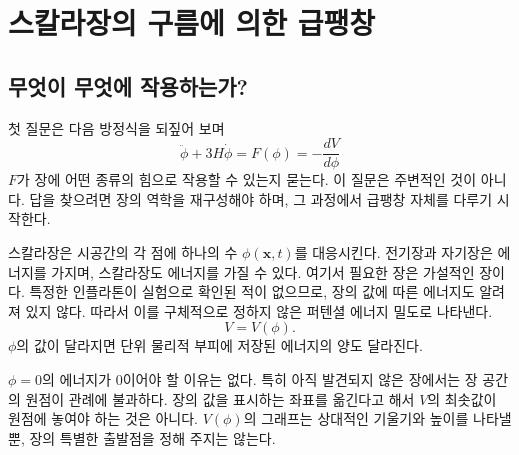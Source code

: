 \chapter{스칼라장의 구름에 의한 급팽창}


\section{무엇이 무엇에 작용하는가?}

첫 질문은 다음 방정식을 되짚어 보며
\begin{equation}
\ddot\phi+3H\dot\phi
=F(\phi)
=-\frac{dV}{d\phi}
\label{eq:c09-opening}
\end{equation}
\(F\)가 장에 어떤 종류의 힘으로 작용할 수 있는지 묻는다. 이 질문은 주변적인 것이 아니다. 답을 찾으려면 장의 역학을 재구성해야 하며, 그 과정에서 급팽창 자체를 다루기 시작한다.

스칼라장은 시공간의 각 점에 하나의 수 \(\phi(\mathbf x,t)\)를 대응시킨다. 전기장과 자기장은 에너지를 가지며, 스칼라장도 에너지를 가질 수 있다. 여기서 필요한 장은 가설적인 장이다. 특정한 인플라톤이 실험으로 확인된 적이 없으므로, 장의 값에 따른 에너지도 알려져 있지 않다. 따라서 이를 구체적으로 정하지 않은 퍼텐셜 에너지 밀도로 나타낸다.
\begin{equation}
V=V(\phi).
\label{eq:c09-potential}
\end{equation}
\(\phi\)의 값이 달라지면 단위 물리적 부피에 저장된 에너지의 양도 달라진다.

\(\phi=0\)의 에너지가 0이어야 할 이유는 없다. 특히 아직 발견되지 않은 장에서는 장 공간의 원점이 관례에 불과하다. 장의 값을 표시하는 좌표를 옮긴다고 해서 \(V\)의 최솟값이 원점에 놓여야 하는 것은 아니다. \(V(\phi)\)의 그래프는 상대적인 기울기와 높이를 나타낼 뿐, 장의 특별한 출발점을 정해 주지는 않는다.


